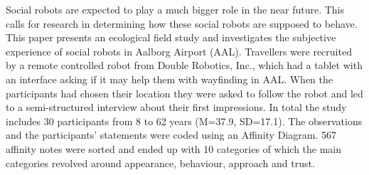\label{Abstract}
Social robots are expected to play a much bigger role in the near future. This calls for research in determining how these social robots are supposed to behave. This paper presents an ecological field study and investigates the subjective experience of social robots in Aalborg Airport (AAL). Travellers were recruited by a remote controlled robot from Double Robotics, Inc., which had a tablet with an interface asking if it may help them with wayfinding in AAL. When the participants had chosen their location they were asked to follow the robot and led to a semi-structured interview about their first impressions. In total the study includes 30 participants from 8 to 62 years (M=37.9, SD=17.1). The observations and the participants' statements were coded using an Affinity Diagram. 567 affinity notes were sorted and ended up with 10 categories of which the main categories revolved around appearance, behaviour, approach and trust. 


